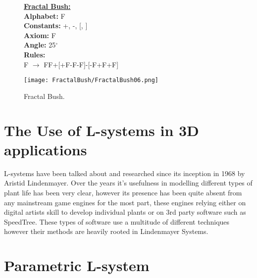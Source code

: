 \begin{figure}[htbp]
	\raggedright
	\textbf{\underline{Fractal Bush:}} \\
	\textbf{Alphabet:} F\\
	\textbf{Constants:} +, -, [, ] \\
	\textbf{Axiom:} F \\
	\textbf{Angle:} 25$^\circ$ \\
	\textbf{Rules:} \\
	F $\rightarrow$ FF+[+F-F-F]-[-F+F+F]\\
	{\centering
		\vspace{7px}
		\texttt{[image: FractalBush/FractalBush06.png]}
		\caption{Fractal Bush.}
	}
\end{figure}

\FloatBarrier
\newpage

\section{The Use of L-systems in 3D applications}

L-systems have been talked about and researched since its inception in 1968 by Aristid Lindenmayer. Over the years it's usefulness in modelling different types of plant life has been very clear, however its presence has been quite absent from any mainstream game engines for the most part, these engines relying either on digital artists skill to develop individual plants or on 3rd party software such as SpeedTree. These types of software use a multitude of different techniques however their methods are heavily rooted in Lindenmayer Systems. 

\newpage

\section{Parametric L-system}

